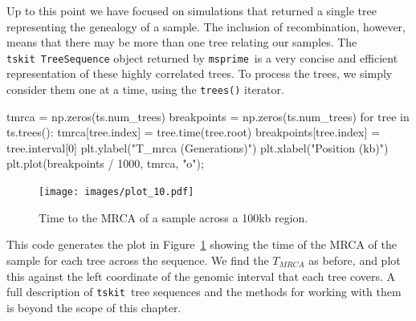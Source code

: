 \documentclass[graybox]{svmult}
\newcommand{\msprime}[0]{\texttt{msprime}}
\newcommand{\tskit}[0]{\texttt{tskit}}
\begin{document}
Up to this point we have focused on simulations that returned a single
tree representing the genealogy of a sample. The inclusion of
recombination, however, means that there may be more than one tree
relating our samples. The \tskit\ \texttt{TreeSequence} object returned by
\msprime\ is a very concise and efficient representation of these highly
correlated trees. To process the trees, we simply consider
them one at a time, using the \texttt{trees()} iterator.

\begin{pythoncode}
tmrca = np.zeros(ts.num_trees)
breakpoints = np.zeros(ts.num_trees)
for tree in ts.trees():
    tmrca[tree.index] = tree.time(tree.root)
    breakpoints[tree.index] = tree.interval[0]
plt.ylabel("T_mrca (Generations)")
plt.xlabel("Position (kb)")
plt.plot(breakpoints / 1000, tmrca, "o");
\end{pythoncode}

\begin{figure}
\begin{center}
\texttt{[image: images/plot\_10.pdf]}
\end{center}
\caption{\label{fig:tree_tmrcas}Time to the MRCA of
a sample across a 100kb region.}
\end{figure}

This code generates the plot in Figure~\ref{fig:tree_tmrcas} showing the time of the MRCA of the sample for each tree across the
sequence. We find the \(T_{MRCA}\) as before, and plot this against the
left coordinate of the genomic interval that each tree covers. A full description of
\tskit\ tree sequences and the methods for working with them is
beyond the scope of this chapter.



\end{document}
